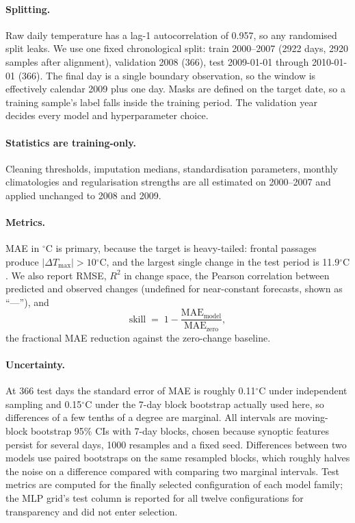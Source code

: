 \documentclass[11pt,a4paper]{article}
\newcommand{\dmax}{\Delta T_{\max}}
\newcommand{\tc}{\ensuremath{^{\circ}\mathrm{C}}}
\begin{document}
\paragraph{Splitting.} Raw daily temperature has a lag-1 autocorrelation of 0.957, so any randomised split leaks. We use one fixed chronological split: train 2000--2007 (2922 days, 2920 samples after alignment), validation 2008 (366), test 2009-01-01 through 2010-01-01 (366). The final day is a single boundary observation, so the window is effectively calendar 2009 plus one day. Masks are defined on the target date, so a training sample's label falls inside the training period. The validation year decides every model and hyperparameter choice.

\paragraph{Statistics are training-only.} Cleaning thresholds, imputation medians, standardisation parameters, monthly climatologies and regularisation strengths are all estimated on 2000--2007 and applied unchanged to 2008 and 2009.

\paragraph{Metrics.} MAE in \tc{} is primary, because the target is heavy-tailed: frontal passages produce $|\dmax| > 10\tc$, and the largest single change in the test period is 11.9\tc{}. We also report RMSE, $R^2$ in change space, the Pearson correlation between predicted and observed changes (undefined for near-constant forecasts, shown as ``---''), and
\begin{equation}
\text{skill} \;=\; 1 - \frac{\text{MAE}_{\text{model}}}{\text{MAE}_{\text{zero}}},
\label{eq:skill}
\end{equation}
the fractional MAE reduction against the zero-change baseline.

\paragraph{Uncertainty.} At 366 test days the standard error of MAE is roughly 0.11\tc{} under independent sampling and 0.15\tc{} under the 7-day block bootstrap actually used here, so differences of a few tenths of a degree are marginal. All intervals are moving-block bootstrap 95\% CIs with 7-day blocks, chosen because synoptic features persist for several days, 1000 resamples and a fixed seed. Differences between two models use paired bootstraps on the same resampled blocks, which roughly halves the noise on a difference compared with comparing two marginal intervals. Test metrics are computed for the finally selected configuration of each model family; the MLP grid's test column is reported for all twelve configurations for transparency and did not enter selection.
\end{document}
